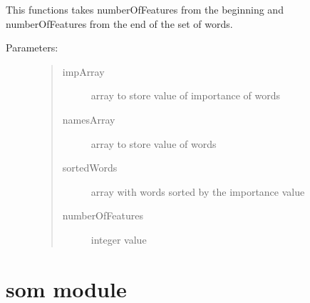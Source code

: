 \documentclass[letterpaper,10pt,english]{sphinxmanual}
\begin{document}

\begin{fulllineitems}
\label{\detokenize{metrics:metrics.takeXMostSignificantFeatures}}
\pysigstartsignatures
{}
\pysigstopsignatures
\sphinxAtStartPar
This functions takes numberOfFeatures from the beginning and numberOfFeatures from the end of the set of words.
\begin{description}
\item[{Parameters:}] \leavevmode\begin{quote}\begin{description}
\item[{impArray}] \leavevmode
\sphinxAtStartPar
array to store value of importance of words

\item[{namesArray}] \leavevmode
\sphinxAtStartPar
array to store value of words

\item[{sortedWords}] \leavevmode
\sphinxAtStartPar
array with words sorted by the importance value

\item[{numberOfFeatures}] \leavevmode
\sphinxAtStartPar
integer value

\end{description}\end{quote}

\end{description}

\end{fulllineitems}


\sphinxstepscope


\section{som module}
\label{\detokenize{som:module-som}}\label{\detokenize{som:som-module}}\label{\detokenize{som::doc}}
\end{document}
